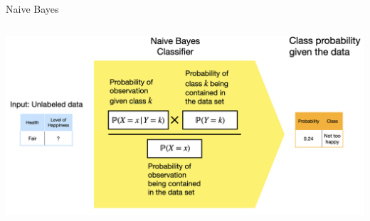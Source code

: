\documentclass[11pt,compress,t,notes=noshow, xcolor=table]{beamer}
\begin{document}
\begin{vbframe}{Naive Bayes}
\begin{columns}
\begin{column}{0.75\textwidth}
  \includegraphics[width=1\textwidth]{slides/supervised-classification/figure_man/nutshell-classification-naive-bayes-prediction.png}

\end{column}
\end{columns}






\end{vbframe}

\endlecture
\end{document}
